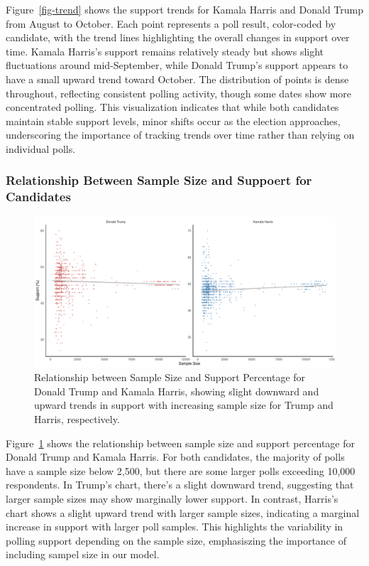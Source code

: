 \documentclass[
  letterpaper,
  DIV=11,
  numbers=noendperiod]{scrartcl}
\begin{document}
Figure~\ref{fig-trend} shows the support trends for Kamala Harris and
Donald Trump from August to October. Each point represents a poll
result, color-coded by candidate, with the trend lines highlighting the
overall changes in support over time. Kamala Harris's support remains
relatively steady but shows slight fluctuations around mid-September,
while Donald Trump's support appears to have a small upward trend toward
October. The distribution of points is dense throughout, reflecting
consistent polling activity, though some dates show more concentrated
polling. This visualization indicates that while both candidates
maintain stable support levels, minor shifts occur as the election
approaches, underscoring the importance of tracking trends over time
rather than relying on individual polls.

\newpage

\hypertarget{relationship-between-sample-size-and-suppoert-for-candidates}{%
\subsubsection{Relationship Between Sample Size and Suppoert for
Candidates}\label{relationship-between-sample-size-and-suppoert-for-candidates}}

\begin{figure}

{\centering \includegraphics{paper_files/figure-pdf/fig-pct-1.pdf}

}

\caption{\label{fig-pct}Relationship between Sample Size and Support
Percentage for Donald Trump and Kamala Harris, showing slight downward
and upward trends in support with increasing sample size for Trump and
Harris, respectively.}

\end{figure}

Figure~\ref{fig-pct} shows the relationship between sample size and
support percentage for Donald Trump and Kamala Harris. For both
candidates, the majority of polls have a sample size below 2,500, but
there are some larger polls exceeding 10,000 respondents. In Trump's
chart, there's a slight downward trend, suggesting that larger sample
sizes may show marginally lower support. In contrast, Harris's chart
shows a slight upward trend with larger sample sizes, indicating a
marginal increase in support with larger poll samples. This highlights
the variability in polling support depending on the sample size,
emphasiszing the importance of including sampel size in our model.
\end{document}
